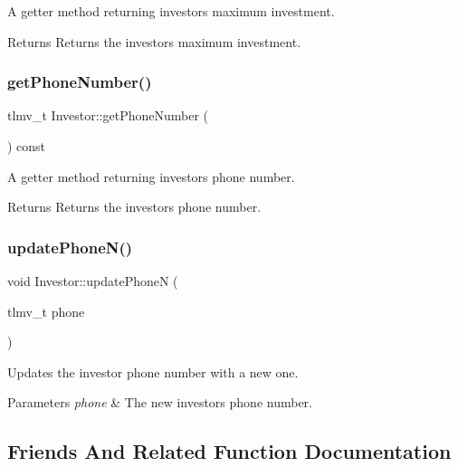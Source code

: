 A getter method returning investor\textquotesingle{}s maximum investment. \begin{DoxyReturn}{Returns}
Returns the investor\textquotesingle{}s maximum investment. 
\end{DoxyReturn}
\mbox{\label{class_investor_a4cc2fa15276dc36061d6fd661bcbd644}} 
\subsubsection{\texorpdfstring{get\+Phone\+Number()}{getPhoneNumber()}}
{\footnotesize\ttfamily tlmv\+\_\+t Investor\+::get\+Phone\+Number (\begin{DoxyParamCaption}{ }\end{DoxyParamCaption}) const}

A getter method returning investor\textquotesingle{}s phone number. \begin{DoxyReturn}{Returns}
Returns the investor\textquotesingle{}s phone number. 
\end{DoxyReturn}
\mbox{\label{class_investor_a94e24cd52ee5f98a792bcaf73d39e2c8}} 
\subsubsection{\texorpdfstring{update\+Phone\+N()}{updatePhoneN()}}
{\footnotesize\ttfamily void Investor\+::update\+PhoneN (\begin{DoxyParamCaption}\item[{tlmv\+\_\+t}]{phone }\end{DoxyParamCaption})}

Updates the investor phone number with a new one. 
\begin{DoxyParams}{Parameters}
{\em phone} & The new investor\textquotesingle{}s phone number. \\
\hline
\end{DoxyParams}


\subsection{Friends And Related Function Documentation}
\mbox{\label{class_investor_a0a2b14c916980c5267b1893aa0b3dc59}} 
